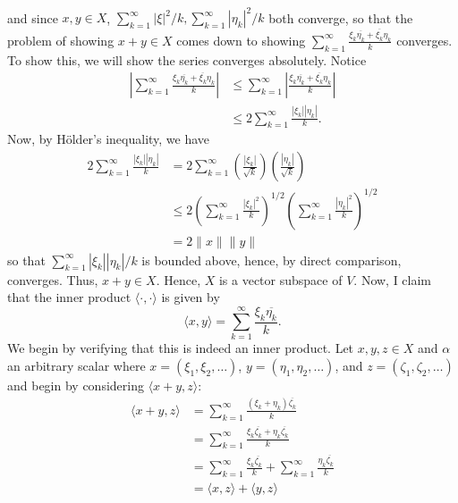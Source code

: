 \documentclass{article}
\begin{document}
\begin{itemize}
\begin{align*}
    \end{align*}
    and since $x, y \in X$, $\sum_{k=1}^{\infty} |\xi|^2/k, \sum_{k=1}^{\infty} |\eta_k|^2/k$ both converge, so that the problem of showing $x + y \in X$ comes down to showing $\sum_{k=1}^{\infty} \frac{\xi_k\overline{\eta_k} + \overline{\xi_k}\eta_k}{k}$ converges. To show this, we will show the series converges absolutely. Notice
    \begin{align*}
        \left|\sum_{k = 1}^{\infty}\frac{\xi_k\overline{\eta_k} + \overline{\xi_k}\eta_k}{k}\right| &\leq \sum_{k = 1}^{\infty} \left|\frac{\xi_k\overline{\eta_k} + \overline{\xi_k}\eta_k}{k}\right|\\
        &\leq 2\sum_{k = 1}^{\infty} \frac{|\xi_k||\eta_k|}{k}.
    \end{align*}
    Now, by H{\"o}lder's inequality, we have
    \begin{align*}
        2\sum_{k = 1}^{\infty}\frac{|\xi_k||\eta_k|}{k} &= 2\sum_{k = 1}^{\infty} \left(\frac{|\xi_k|}{\sqrt{k}}\right)\left(\frac{|\eta_k|}{\sqrt{k}}\right)\\
        &\leq 2\left(\sum_{k = 1}^{\infty} \frac{|\xi_k|^2}{k}\right)^{1/2}\left(\sum_{k = 1}^{\infty}\frac{|\eta_k|^2}{k}\right)^{1/2}\\
        &= 2\|x\|\|y\|
    \end{align*}
    so that $\sum_{k = 1}^{\infty} |\xi_k||\eta_k|/k$ is bounded above, hence, by direct comparison, converges. Thus, $x + y \in X$. Hence, $X$ is a vector subspace of $V$.
    \newline
    Now, I claim that the inner product $\langle \cdot , \cdot \rangle$ is given by
    \[\langle x, y \rangle = \sum_{k = 1}^{\infty} \frac{\xi_k\overline{\eta_k}}{k}.\]
    We begin by verifying that this is indeed an inner product. Let $x, y, z \in X$ and $\alpha$ an arbitrary scalar where $x = (\xi_1, \xi_2, \dots)$, $y = (\eta_1, \eta_2, \dots)$, and $z = (\zeta_1, \zeta_2, \dots)$ and begin by considering $\langle x + y, z \rangle$:
    \begin{align*}
        \langle x + y, z\rangle &= \sum_{k = 1}^{\infty} \frac{(\xi_k + \eta_k)\overline{\zeta_k}}{k}\\
        &= \sum_{k = 1}^{\infty} \frac{\xi_k\overline{\zeta_k} + \eta_k\overline{\zeta_k}}{k}\\
        &= \sum_{k = 1}^{\infty} \frac{\xi_k\overline{\zeta_k}}{k} + \sum_{k = 1}^{\infty} \frac{\eta_k\overline{\zeta_k}}{k}\\
        &= \langle x, z \rangle + \langle y, z\rangle

\end{align*}
\end{itemize}
\end{document}
